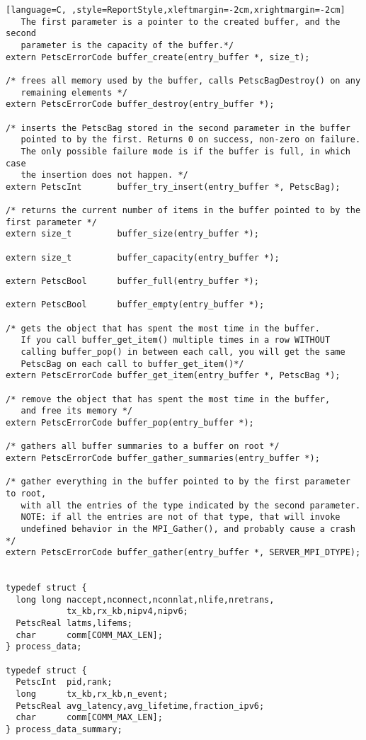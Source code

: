 \documentclass[11pt]{article}
\begin{document}
\begin{lstlisting}[language=C, ,style=ReportStyle,xleftmargin=-2cm,xrightmargin=-2cm]
   The first parameter is a pointer to the created buffer, and the second 
   parameter is the capacity of the buffer.*/
extern PetscErrorCode buffer_create(entry_buffer *, size_t);

/* frees all memory used by the buffer, calls PetscBagDestroy() on any
   remaining elements */
extern PetscErrorCode buffer_destroy(entry_buffer *);

/* inserts the PetscBag stored in the second parameter in the buffer 
   pointed to by the first. Returns 0 on success, non-zero on failure.
   The only possible failure mode is if the buffer is full, in which case
   the insertion does not happen. */
extern PetscInt       buffer_try_insert(entry_buffer *, PetscBag);

/* returns the current number of items in the buffer pointed to by the first parameter */
extern size_t         buffer_size(entry_buffer *);

extern size_t         buffer_capacity(entry_buffer *);

extern PetscBool      buffer_full(entry_buffer *);

extern PetscBool      buffer_empty(entry_buffer *);

/* gets the object that has spent the most time in the buffer.
   If you call buffer_get_item() multiple times in a row WITHOUT
   calling buffer_pop() in between each call, you will get the same
   PetscBag on each call to buffer_get_item()*/
extern PetscErrorCode buffer_get_item(entry_buffer *, PetscBag *);

/* remove the object that has spent the most time in the buffer,
   and free its memory */
extern PetscErrorCode buffer_pop(entry_buffer *);

/* gathers all buffer summaries to a buffer on root */
extern PetscErrorCode buffer_gather_summaries(entry_buffer *);

/* gather everything in the buffer pointed to by the first parameter to root,
   with all the entries of the type indicated by the second parameter.
   NOTE: if all the entries are not of that type, that will invoke 
   undefined behavior in the MPI_Gather(), and probably cause a crash */
extern PetscErrorCode buffer_gather(entry_buffer *, SERVER_MPI_DTYPE);


typedef struct {
  long long naccept,nconnect,nconnlat,nlife,nretrans,
            tx_kb,rx_kb,nipv4,nipv6;
  PetscReal latms,lifems;
  char      comm[COMM_MAX_LEN];
} process_data;

typedef struct {
  PetscInt  pid,rank;
  long      tx_kb,rx_kb,n_event;
  PetscReal avg_latency,avg_lifetime,fraction_ipv6;
  char      comm[COMM_MAX_LEN];
} process_data_summary;


\end{lstlisting}
\end{document}
